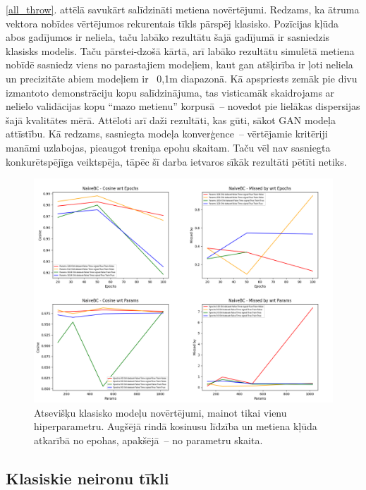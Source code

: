 \documentclass[12pt, a4paper]{article}
\numberwithin{equation}{section} %
\begin{document}
\ref{all_throw}. attēlā savukārt salīdzināti metiena novērtējumi. Redzams, ka ātruma vektora nobīdes vērtējumos rekurentais tīkls pārspēj klasisko. Pozīcijas kļūda abos gadījumos ir neliela, taču labāko rezultātu šajā gadījumā ir sasniedzis klasisks modelis. Taču pārstei-dzošā kārtā, arī labāko rezultātu simulētā metiena nobīdē sasniedz viens no parastajiem modeļiem, kaut gan atšķirība ir ļoti neliela un precizitāte abiem modeļiem ir ~0,1m diapazonā. Kā apspriests zemāk pie divu izmantoto demonstrāciju kopu salīdzinājuma, tas visticamāk skaidrojams ar nelielo validācijas kopu ``mazo metienu'' korpusā~-- novedot pie lielākas dispersijas šajā kvalitātes mērā. Attēloti arī daži rezultāti, kas gūti, sākot GAN modeļa attīstību. Kā redzams, sasniegta modeļa konverģence~-- vērtējamie kritēriji manāmi uzlabojas, pieaugot treniņa epohu skaitam. Taču vēl nav sasniegta konkurētspējīga veiktspēja, tāpēc šī darba ietvaros sīkāk rezultāti pētīti netiks. 

\begin{figure}[t!]
    \centering
    \includegraphics[width=16cm,page=1]{../img/naivebc-independent-params-epoch.png}
    \caption{Atsevišķu klasisko modeļu novērtējumi, mainot tikai vienu hiperparametru. Augšējā rindā kosinusu līdzība un metiena kļūda atkarībā no epohas, apakšējā~-- no parametru skaita.}
    \label{classic_independent}
\end{figure}

\subsection{Klasiskie neironu tīkli}
\end{document}
